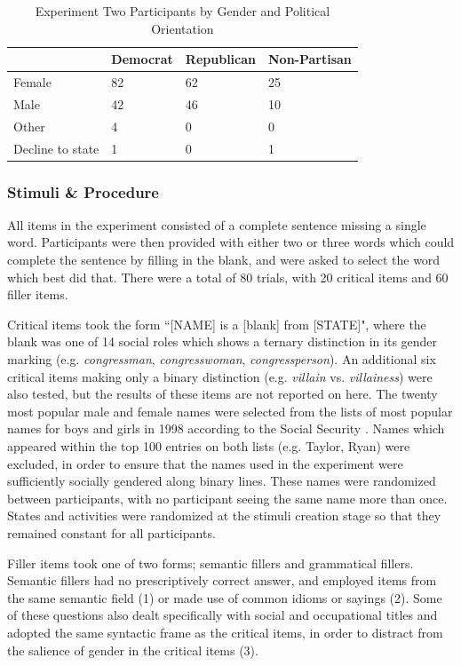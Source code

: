 \documentclass[10pt,letterpaper]{article}
\begin{document}
	\begin{table}[!ht]
		\begin{center} 
			\caption{Experiment Two Participants by Gender and Political Orientation} 
			\label{exp2-sample-table} 
			\vskip 0.12in
			\begin{tabular}{llll} 
				\hline
				&  Democrat & Republican & Non-Partisan \\
				\hline
				Female &  82 & 62 & 25 \\
				Male & 42 & 46 & 10 \\
				Other & 4 & 0 & 0 \\
				Decline to state & 1 & 0 & 1 \\
				\hline
			\end{tabular} 
		\end{center} 
	\end{table}
	
	\subsubsection{Stimuli \& Procedure} All items in the experiment consisted of a complete sentence missing a single word. Participants were then provided with either two or three words which could complete the sentence by filling in the blank, and were asked to select the word which best did that. There were a total of 80 trials, with 20 critical items and 60 filler items.\par 
	Critical items took the form ``[NAME] is a [blank] from [STATE]", where the blank was one of 14 social roles which shows a ternary distinction in its gender marking (e.g. \textit{congressman}, \textit{congresswoman}, \textit{congressperson}). An additional six critical items making only a binary distinction (e.g. \textit{villain} vs. \textit{villainess}) were also tested, but the results of these items are not reported on here. The twenty most popular male and female names were selected from the lists of most popular names for boys and girls in 1998 according to the Social Security \textcite{socialsecurity}. Names which appeared within the top 100 entries on both lists (e.g. Taylor, Ryan) were excluded, in order to ensure that the names used in the experiment were sufficiently socially gendered along binary lines. These names were randomized between participants, with no participant seeing the same name more than once. States and activities were randomized at the stimuli creation stage so that they remained constant for all participants.\par 
	Filler items took one of two forms; semantic fillers and grammatical fillers. Semantic fillers had no prescriptively correct answer, and employed items from the same semantic field (1) or made use of common idioms or sayings (2). Some of these questions also dealt specifically with social and occupational titles and adopted the same syntactic frame as the critical items, in order to distract from the salience of gender in the critical items (3). 
	
\end{document}
